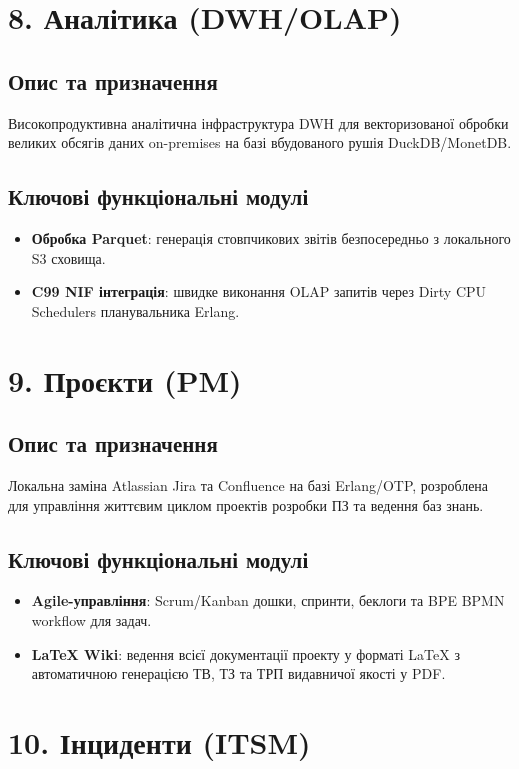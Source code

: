 \section{8. Аналітика (DWH/OLAP)}
\subsection{Опис та призначення}
Високопродуктивна аналітична інфраструктура DWH для векторизованої обробки великих обсягів даних on-premises на базі вбудованого рушія DuckDB/MonetDB.
\subsection{Ключові функціональні модулі}
\begin{itemize}
    \item \textbf{Обробка Parquet}: генерація стовпчикових звітів безпосередньо з локального S3 сховища.
    \item \textbf{C99 NIF інтеграція}: швидке виконання OLAP запитів через Dirty CPU Schedulers планувальника Erlang.
\end{itemize}

\section{9. Проєкти (PM)}
\subsection{Опис та призначення}
Локальна заміна Atlassian Jira та Confluence на базі Erlang/OTP, розроблена для управління життєвим циклом проектів розробки ПЗ та ведення баз знань.
\subsection{Ключові функціональні модулі}
\begin{itemize}
    \item \textbf{Agile-управління}: Scrum/Kanban дошки, спринти, беклоги та BPE BPMN workflow для задач.
    \item \textbf{LaTeX Wiki}: ведення всієї документації проекту у форматі LaTeX з автоматичною генерацією ТВ, ТЗ та ТРП видавничої якості у PDF.
\end{itemize}

\section{10. Інциденти (ITSM)}
